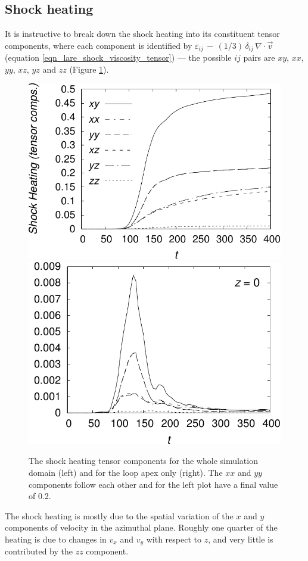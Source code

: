 \documentclass{./packages/rs/rsproca}
\begin{document}
\subsection{Shock heating}
\label{sec_NumericalResults_ShockHeating}
It is instructive to break down the shock heating into its constituent tensor components, where each component is identified by $\varepsilon_{ij}\,-\,(1/3)\,\delta_{ij}\,\nabla\cdot\vec{v}\,$ (equation \ref{eqn_lare_shock_viscosity_tensor}) --- the possible $ij$ pairs are $xy$, $xx$, $yy$, $xz$, $yz$ and $zz$ (Figure \ref{ht_visc_comp}).
\begin{figure}[h!]
  \center  
  \includegraphics[scale=0.55]{./gnuplot/256x256x512/ht_visc_comp}
  \includegraphics[scale=0.55]{./gnuplot/256x256x512/ht_visc_comp_apex}
  \caption{\small{The shock heating tensor components for the whole simulation domain (left) and for the loop apex only (right). The $xx$ and $yy$ components follow each other and for the left plot have a final value of 0.2.}}
  \label{ht_visc_comp}
  \vspace{-10pt}
\end{figure}
 The shock heating is mostly due to the spatial variation of the $x$ and $y$ components of velocity in the azimuthal plane. Roughly one quarter of the heating is due to changes in $v_x$ and $v_y$ with respect to $z$, and very little is contributed by the $zz$ component. 
\end{document}
